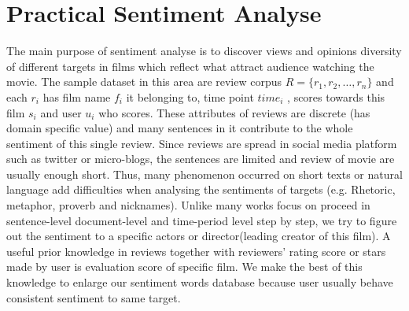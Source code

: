 \section{Practical Sentiment Analyse}
\label{sec:sent}
\par The main purpose of sentiment analyse is to discover views and opinions diversity of different targets in films which reflect what attract audience watching the movie. The sample dataset in this area are review corpus $ R =\{r_1, r_2, \dots, r_n\}$ and each $r_i$ has film name  $f_i$ it belonging to, time point $time_i$ , scores towards this film $s_i$ and user $u_i$ who scores. These attributes of reviews are discrete (has domain specific value) and many sentences in it contribute to the whole sentiment of this single review. Since reviews are spread in social media platform such as twitter or micro-blogs, the sentences are limited and review of movie are usually enough short. Thus, many phenomenon occurred on short texts or natural language add difficulties when analysing the sentiments of targets (e.g. Rhetoric, metaphor, proverb and nicknames). Unlike many works focus on proceed in sentence-level document-level and time-period level step by step, we try to figure out the sentiment to a specific actors or director(leading creator of this film). A useful prior knowledge in reviews together with reviewers' rating score or stars made by user is evaluation score of specific film. We make the best of this knowledge to enlarge our sentiment words database because user usually behave consistent sentiment to same target.


